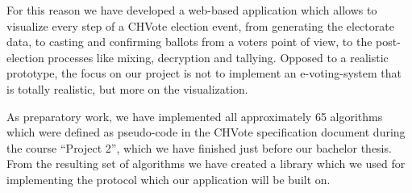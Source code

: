 For this reason we have developed a web-based application which allows to visualize every step of a CHVote election event, from generating the electorate data, to casting and confirming ballots from a voters point of view, to the post-election processes like mixing, decryption and tallying. Opposed to a realistic prototype, the focus on our project is not to implement an e-voting-system that is totally realistic, but more on the visualization.  

As preparatory work, we have implemented all approximately 65 algorithms which were defined as pseudo-code in the CHVote specification document during the course "`Project 2"', which we have finished just before our bachelor thesis. From the resulting set of algorithms we have created a library which we used for implementing the protocol which our application will be built on.